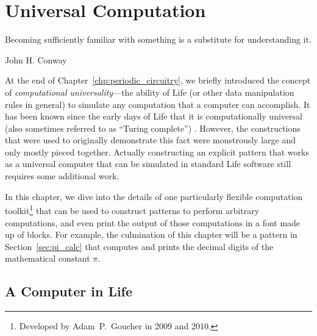 
\renewcommand{\chapterfolder}{universal_computation/}
\chapter{Universal Computation}\label{chp:universal_computation}



\vspace*{-0.4in}
\epigraph{Becoming sufficiently familiar with something is a substitute for understanding it.}{John H. Conway}
\vspace*{0.4in}


\noindent At the end of Chapter~\ref{chp:periodic_circuitry}, we briefly introduced the concept of \emph{computational universality}---the ability of Life (or other data manipulation rules in general) to simulate any computation that a computer can accomplish. It has been known since the early days of Life that it is computationally universal (also sometimes referred to as ``Turing complete'') \cite{Wain74,BCG82}.  However, the constructions that were used to originally demonstrate this fact were monstrously large and only mostly pieced together. Actually constructing an explicit pattern that works as a universal computer that can be simulated in standard Life software still requires some additional work.

In this chapter, we dive into the details of one particularly flexible computation toolkit\footnote{Developed by Adam~P.~Goucher in 2009 and 2010.} that can be used to construct patterns to perform arbitrary computations, and even print the output of those computations in a font made up of blocks. For example, the culmination of this chapter will be a pattern in Section~\ref{sec:pi_calc} that computes and prints the decimal digits of the mathematical constant $\pi$.


\section{A Computer in Life}\label{sec:computer_in_life}

